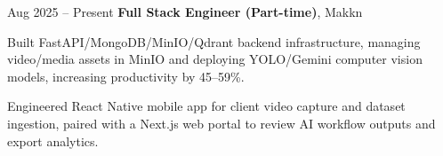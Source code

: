 \begin{twocolentry}{
            Aug 2025 – Present
        }
\textbf{Full Stack Engineer (Part-time)}, Makkn\end{twocolentry}

\vspace{0.10 cm}
\begin{onecolentry}
    \begin{highlights}
        \item Built FastAPI/MongoDB/MinIO/Qdrant backend infrastructure, managing video/media assets in MinIO and deploying YOLO/Gemini computer vision models, increasing productivity by 45--59\%.
        \item Engineered React Native mobile app for client video capture and dataset ingestion, paired with a Next.js web portal to review AI workflow outputs and export analytics.
    \end{highlights}
\end{onecolentry}